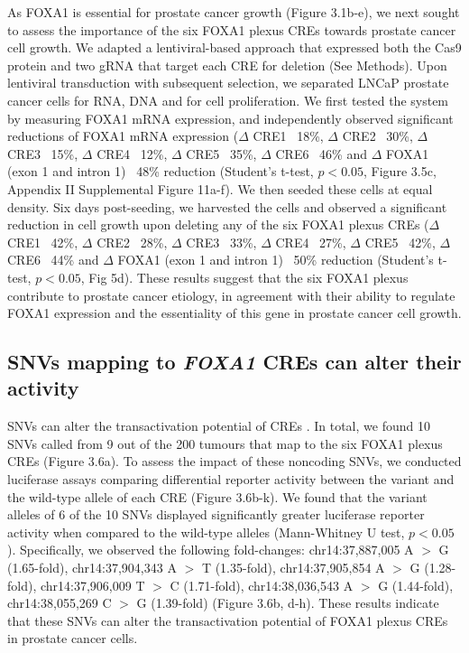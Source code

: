 As FOXA1 is essential for prostate cancer growth (Figure 3.1b-e), we next sought to assess the importance of the six FOXA1 plexus CREs towards prostate cancer cell growth.
We adapted a lentiviral-based approach that expressed both the Cas9 protein and two gRNA that target each CRE for deletion (See Methods).
Upon lentiviral transduction with subsequent selection, we separated LNCaP prostate cancer cells for RNA, DNA and for cell proliferation.
We first tested the system by measuring FOXA1 mRNA expression, and independently observed significant reductions of FOXA1 mRNA expression ($\Delta$ CRE1 ~18\%, $\Delta$ CRE2 ~30\%, $\Delta$ CRE3 ~15\%, $\Delta$ CRE4 ~12\%, $\Delta$ CRE5 ~35\%, $\Delta$ CRE6 ~46\% and $\Delta$ FOXA1 (exon 1 and intron 1) ~48\% reduction (Student’s t-test, $p<0.05$, Figure 3.5c, Appendix II Supplemental Figure 11a-f).
We then seeded these cells at equal density.
Six days post-seeding, we harvested the cells and observed a significant reduction in cell growth upon deleting any of the six FOXA1 plexus CREs ($\Delta$ CRE1 ~42\%, $\Delta$ CRE2 ~28\%, $\Delta$ CRE3 ~33\%, $\Delta$ CRE4 ~27\%, $\Delta$ CRE5 ~42\%, $\Delta$ CRE6 ~44\% and $\Delta$ FOXA1 (exon 1 and intron 1) ~50\% reduction (Student’s t-test, $p<0.05$, Fig 5d).
These results suggest that the six FOXA1 plexus contribute to prostate cancer etiology, in agreement with their ability to regulate FOXA1 expression and the essentiality of this gene in prostate cancer cell growth.

\subsection{SNVs mapping to \emph{FOXA1} CREs can alter their activity}

SNVs can alter the transactivation potential of CREs \cite{baileyNoncodingSomaticInherited2016,rheinbayRecurrentFunctionalRegulatory2017,zhangIntegrativeFunctionalGenomics2012,huangHighlyRecurrentTERT2013,hornTERTPromoterMutations2013,fuxmanbassHumanGeneCenteredTranscription2015,zhouEmergenceNoncodingCancer2016,feiginRecurrentNoncodingRegulatory2017,khuranaRoleNoncodingSequence2016,cowper-sal*lariBreastCancerRisk2012}.
In total, we found 10 SNVs called from 9 out of the 200 tumours that map to the six FOXA1 plexus CREs (Figure 3.6a).
To assess the impact of these noncoding SNVs, we conducted luciferase assays comparing differential reporter activity between the variant and the wild-type allele of each CRE (Figure 3.6b-k).
We found that the variant alleles of 6 of the 10 SNVs displayed significantly greater luciferase reporter activity when compared to the wild-type alleles (Mann-Whitney U test, $p<0.05$).
Specifically, we observed the following fold-changes: chr14:37,887,005 A $>$ G (1.65-fold), chr14:37,904,343 A $>$ T (1.35-fold), chr14:37,905,854 A $>$ G (1.28-fold), chr14:37,906,009 T $>$ C (1.71-fold), chr14:38,036,543 A $>$ G (1.44-fold), chr14:38,055,269 C $>$ G (1.39-fold) (Figure 3.6b, d-h).
These results indicate that these SNVs can alter the transactivation potential of FOXA1 plexus CREs in prostate cancer cells.

